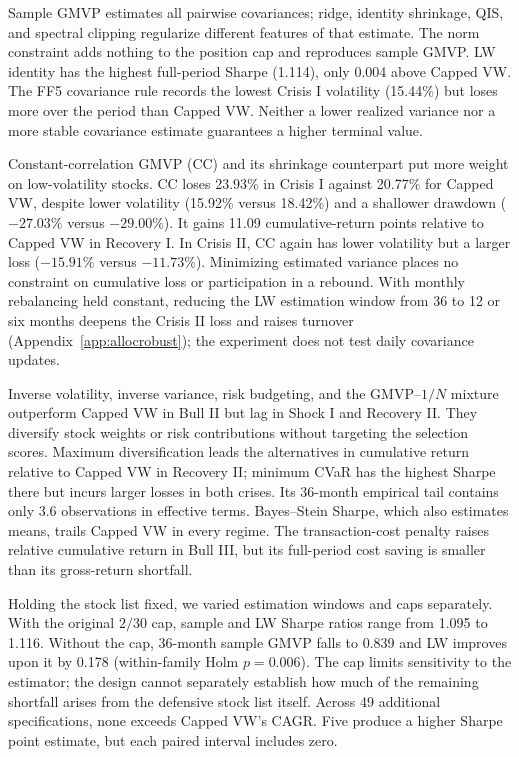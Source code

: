 \documentclass[letterpaper,journal]{IEEEtran}
\begin{document}
Sample GMVP estimates all pairwise covariances; ridge, identity shrinkage, QIS, and spectral clipping regularize different features of that estimate. The norm constraint adds nothing to the position cap and reproduces sample GMVP. LW identity has the highest full-period Sharpe (1.114), only 0.004 above Capped VW. The FF5 covariance rule records the lowest Crisis I volatility (15.44\%) but loses more over the period than Capped VW. Neither a lower realized variance nor a more stable covariance estimate guarantees a higher terminal value.

Constant-correlation GMVP (CC) and its shrinkage counterpart put more weight on low-volatility stocks. CC loses 23.93\% in Crisis I against 20.77\% for Capped VW, despite lower volatility (15.92\% versus 18.42\%) and a shallower drawdown ($-27.03\%$ versus $-29.00\%$). It gains 11.09 cumulative-return points relative to Capped VW in Recovery I. In Crisis II, CC again has lower volatility but a larger loss ($-15.91\%$ versus $-11.73\%$). Minimizing estimated variance places no constraint on cumulative loss or participation in a rebound. With monthly rebalancing held constant, reducing the LW estimation window from 36 to 12 or six months deepens the Crisis II loss and raises turnover (Appendix~\ref{app:allocrobust}); the experiment does not test daily covariance updates.

Inverse volatility, inverse variance, risk budgeting, and the GMVP--$1/N$ mixture outperform Capped VW in Bull II but lag in Shock I and Recovery II. They diversify stock weights or risk contributions without targeting the selection scores. Maximum diversification leads the alternatives in cumulative return relative to Capped VW in Recovery II; minimum CVaR has the highest Sharpe there but incurs larger losses in both crises. Its 36-month empirical tail contains only 3.6 observations in effective terms. Bayes--Stein Sharpe, which also estimates means, trails Capped VW in every regime. The transaction-cost penalty raises relative cumulative return in Bull III, but its full-period cost saving is smaller than its gross-return shortfall.

Holding the stock list fixed, we varied estimation windows and caps separately. With the original $2/30$ cap, sample and LW Sharpe ratios range from 1.095 to 1.116. Without the cap, 36-month sample GMVP falls to 0.839 and LW improves upon it by 0.178 (within-family Holm $p=0.006$). The cap limits sensitivity to the estimator; the design cannot separately establish how much of the remaining shortfall arises from the defensive stock list itself. Across 49 additional specifications, none exceeds Capped VW's CAGR. Five produce a higher Sharpe point estimate, but each paired interval includes zero.
\end{document}
